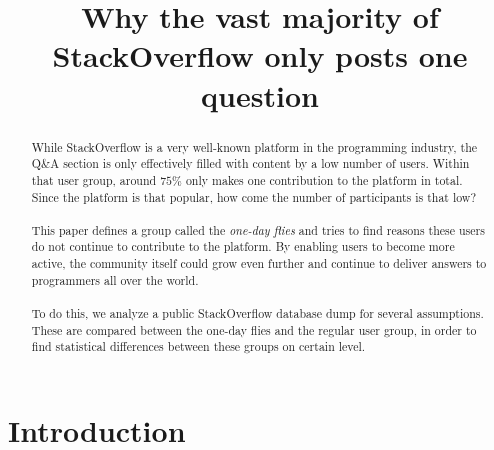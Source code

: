 \documentclass[conference]{IEEEtran}
\begin{document}
%
\title{Why the vast majority of StackOverflow only posts one question}


\author{
\and
{}
}


\maketitle


\begin{abstract}


While StackOverflow is a very well-known platform in the programming industry, the Q\&A section is only effectively filled with content by a low number of users. Within that user group, around $75\%$ only makes one contribution to the platform in total. Since the platform is that popular, how come the number of participants is that low?
\\
\\
This paper defines a group called the \textit{one-day flies} and tries to find reasons these users do not continue to contribute to the platform. By enabling users to become more active, the community itself could grow even further and continue to deliver answers to programmers all over the world.\\
\\
To do this, we analyze a public StackOverflow database dump  for several assumptions. These are  compared between the one-day flies and the regular user group, in order to find statistical differences between these groups on certain level. 

\end{abstract}

\IEEEpeerreviewmaketitle



\section{Introduction}
\end{document}
